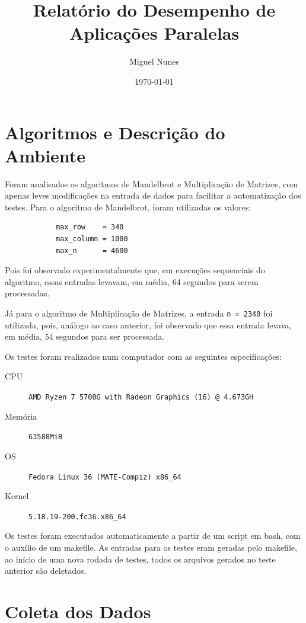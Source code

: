 \documentclass[10pt,a4paper]{article}
\title{Relatório do Desempenho de Aplicações Paralelas}
\author{Miguel Nunes}
\date{\today}
\begin{document}
	\maketitle

	\section{Algoritmos e Descrição do Ambiente}

		Foram analisados os algoritmos de Mandelbrot e Multiplicação de Matrizes, com apenas leves modificações na entrada de dados para
		facilitar a automatização dos testes.
		Para o algoritmo de Mandelbrot, foram utilizadas os valores: 
		
		\begin{verbatim}
			max_row    = 340
			max_column = 1000
			max_n      = 4600
		\end{verbatim}

		Pois foi observado experimentalmente que, em execuções sequenciais do algoritmo, essas entradas levavam, em média, 
		64 segundos para serem processadas.

		Já para o algoritmo de Multiplicação de Matrizes, a entrada \texttt{n = 2340} foi utilizada, pois, 
		análogo ao caso anterior, foi observado que essa entrada levava, em média, 54 segundos para ser processada.

		Os testes foram realizados num computador com as seguintes especificações:

		\begin{description}
			\item[CPU] \texttt{AMD Ryzen 7 5700G with Radeon Graphics (16) @ 4.673GH}
			\item[Memória] \texttt{63588MiB}
			\item[OS] \texttt{Fedora Linux 36 (MATE-Compiz) x86\_64}
			\item[Kernel] \texttt{5.18.19-200.fc36.x86\_64}
		\end{description}

		Os testes foram executados automaticamente a partir de um script em bash, com o auxílio de um makefile. As entradas para os 
		testes eram geradas pelo makefile, ao início de uma nova rodada de testes, todos os arquivos gerados no teste anterior são deletados.

	\section{Coleta dos Dados}
		
\end{document}
